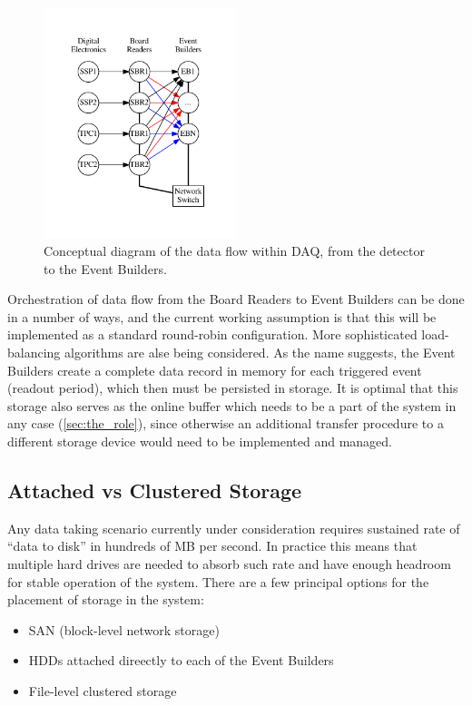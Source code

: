 \documentclass[pdftex,12pt,letter]{article}
\begin{document}
\begin{figure}[tbh]
  \centering
  \includegraphics[width=0.5\textwidth]{figures/upstream.pdf}
  \caption{Conceptual diagram of the data flow within DAQ, from the detector to the Event Builders.}
  \label{fig:upstream}
\end{figure}
\noindent Orchestration of data flow from the Board Readers to Event Builders can be done in a number
of ways, and the current working assumption is that this will be implemented as a standard round-robin
configuration. More sophisticated load-balancing algorithms are alse being considered. As the name suggests,
the Event Builders create a complete data record in memory for each triggered event (readout period),
which then must be persisted in storage. It is optimal that  this storage also serves as the online buffer 
 which needs to be a part of the system in any case (\ref{sec:the_role}), since otherwise an additional transfer procedure
to a different storage device would need to be implemented and managed.

\subsection{Attached vs Clustered Storage}
Any data taking scenario currently under consideration requires sustained rate
of ``data to disk'' in hundreds of MB per second. In practice this means that
multiple hard drives are needed to absorb such rate and have enough headroom
for stable operation of the system.
There are a few principal options for the placement of storage in the system:
\begin{itemize}
\item SAN (block-level network storage)
\item HDDs attached direectly to each of the Event Builders
\item File-level clustered storage
\end{itemize}
\end{document}
